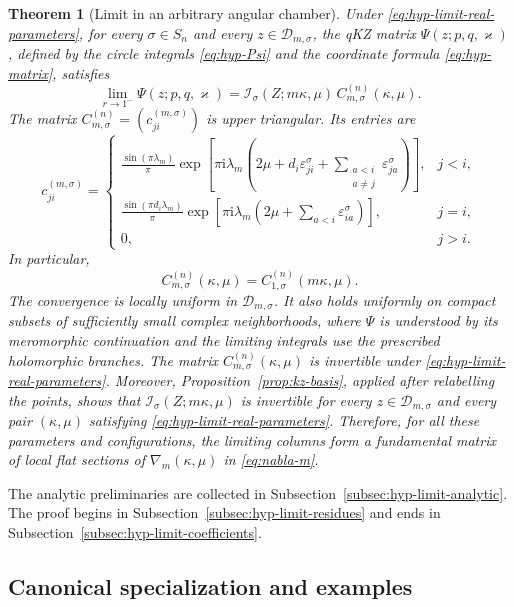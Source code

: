 \documentclass[12pt]{amsart}
\newtheorem{thm}{Theorem}[section]
\theoremstyle{definition}
\numberwithin{equation}{section}
\theoremstyle{definition}
\let\mc\mathcal
\let\eps\varepsilon
\let\ka\kappa
\let\si\sigma
\def\beq{\begin{equation}}
\def\eeq{\end{equation}}
\begin{document}
\begin{thm}[Limit in an arbitrary angular chamber]
\label{thm:hyper-limit-all-chambers}
\label{thm:st1-all-chambers}
Under \eqref{eq:hyp-limit-real-parameters}, for every $\si\in S_n$
and every $z\in\mc D_{m,\si}$, the qKZ matrix
$\Psi(z;p,q,\varkappa)$, defined by the circle integrals
\eqref{eq:hyp-Psi} and the coordinate formula
\eqref{eq:hyp-matrix}, satisfies
\beq\label{eq:hyp-limit-main-sigma}
 \boxed{\quad
 \lim_{r\to1^-}\Psi(z;p,q,\varkappa)
 =\mc I_\si(Z;m\ka,\mu)\,C_{m,\si}^{(n)}(\ka,\mu).
 \quad}
\eeq
The matrix $C_{m,\si}^{(n)}=(c_{ji}^{(m,\si)})$ is upper triangular.
Its entries are
\beq\label{eq:hyp-limit-C-sigma}
 \boxed{
 c_{ji}^{(m,\si)}=
 \begin{cases}
 \displaystyle
 \frac{\sin(\pi\lambda_m)}{\pi}
 \exp\!\left[\pi\mathrm{i}\lambda_m\left(
 2\mu+d_i\eps_{ji}^\si+
 \sum_{\substack{a<i\\a\ne j}}\eps_{ja}^\si\right)\right],&j<i,\\[12pt]
 \displaystyle
 \frac{\sin(\pi d_i\lambda_m)}{\pi}
 \exp\!\left[\pi\mathrm{i}\lambda_m\left(
 2\mu+\sum_{a<i}\eps_{ia}^\si\right)\right],&j=i,\\[10pt]
 0,&j>i.
 \end{cases}}
\eeq
In particular,
\beq\label{eq:hyp-limit-C-compare-sigma}
 \boxed{\quad C_{m,\si}^{(n)}(\ka,\mu)
       =C_{1,\si}^{(n)}(m\ka,\mu).\quad}
\eeq
The convergence is locally uniform in $\mc D_{m,\si}$. It also
holds uniformly on compact subsets of sufficiently small complex
neighborhoods, where $\Psi$ is understood by its meromorphic
continuation and the limiting integrals use the prescribed
holomorphic branches. The matrix $C_{m,\si}^{(n)}(\ka,\mu)$ is
invertible under \eqref{eq:hyp-limit-real-parameters}. Moreover,
Proposition~\ref{prop:kz-basis}, applied after relabelling the points,
shows that $\mc I_\si(Z;m\ka,\mu)$ is invertible for every
$z\in\mc D_{m,\si}$ and every pair $(\ka,\mu)$ satisfying
\eqref{eq:hyp-limit-real-parameters}. Therefore, for all these
parameters and configurations, the limiting columns form a
fundamental matrix of local flat sections of
$\nabla_m(\ka,\mu)$ in \eqref{eq:nabla-m}.
\end{thm}

The analytic preliminaries are collected in
Subsection~\ref{subsec:hyp-limit-analytic}.  The proof begins
in Subsection~\ref{subsec:hyp-limit-residues} and ends in
Subsection~\ref{subsec:hyp-limit-coefficients}.

\subsection{Canonical specialization and examples}
\label{subsec:hyp-limit-canonical}
\end{document}
